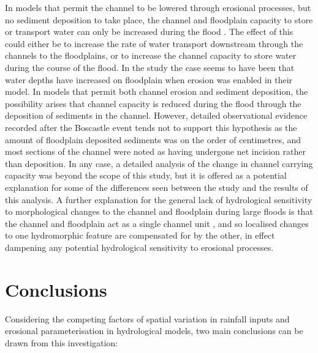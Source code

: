 In models that permit the channel to be lowered through erosional processes, but no sediment deposition to take place, the channel and floodplain capacity to store or transport water can only be increased during the flood \citep[e.g.][]{wong2015sensitivity}. The effect of this could either be to increase the rate of water transport downstream through the channels to the floodplains, or to increase the channel capacity to store water during the course of the flood. In the \citet{wong2015sensitivity} study the case seems to have been that water depths have increased on floodplain when erosion was enabled in their model. In models that permit both channel erosion and sediment deposition,  the possibility arises that channel capacity is reduced during the flood through the deposition of sediments in the channel. However, detailed observational evidence recorded after the Boscastle event tends not to support this hypothesis as the amount of floodplain deposited sediments was on the order of centimetres, and most sections of the channel were noted as having undergone net incision rather than deposition. In any case, a detailed analysis of the change in channel carrying capacity was beyond the scope of this study, but it is offered as a potential explanation for some of the differences seen between the \citet{wong2015sensitivity} study and the results of this analysis. A further explanation for the general lack of hydrological sensitivity to morphological changes to the channel and floodplain during large floods is that the channel and floodplain act as a single channel unit \citep{bates2005numerical}, and so localised changes to one hydromorphic feature are compensated for by the other, in effect dampening any potential hydrological sensitivity to erosional processes.


\section{Conclusions}  %
Considering the competing factors of spatial variation in rainfall inputs and erosional parameterisation in hydrological models, two main conclusions can be drawn from this investigation:

